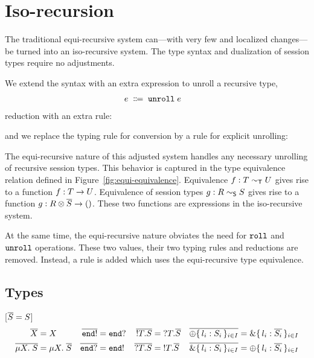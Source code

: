 \section{Iso-recursion}
\label{sec:iso-recursion}

The traditional equi-recursive system can---with very few and localized changes---be turned
into an iso-recursive system. The type syntax and dualization of
session types require no adjustments.

We extend the syntax with an extra expression to unroll a recursive
type,
\begin{align*}
    e \grmdef&
               \EUnroll e
\end{align*}
%
reduction with an extra rule:
%
\begin{mathpar}
\end{mathpar}
%
and we replace the typing rule for conversion by a rule for explicit unrolling:
\begin{mathpar}
\end{mathpar}

The equi-recursive nature of this adjusted system handles any necessary
unrolling of recursive session types. This behavior is captured in the type
equivalence relation defined in Figure~\ref{fig:equi-equivalence}. Equivalence
$f : T \eqt U$ gives rise to a function $f : \TFun {T} {U}$.
Equivalence of session types $g : R \eqs S$ gives rise
to a function $g : \TFun {\TPair {R} {\TDual{S}}} \TUnit$.
These two functions are expressions in the iso-recursive system.

At the same time, the equi-recursive nature obviates the need for $\EkwRoll$
and $\EkwUnroll$ operations. These two values, their two typing rules and
reductions are removed. Instead, a rule is added which uses the equi-recursive
type equivalence.

\subsection{Types}


[$\TDual S = S$]
\begin{align*}
  \TDual X &= X                               &
  \TDual{\TEnd !} &= \TEnd ?                  &
  \TDual{\TOut T S} &= \TIn T \TDual{S}       &
  \TDual{\TSelect{ l_i: S_i }} &=
    \TCase{ l_i: \TDual{S_i} }                \\
  \TDual{\TRec S} &= \TRec{\TDual S}          &
  \TDual{\TEnd ?} &= \TEnd !                  &
  \TDual{\TIn T S} &= \TOut T \TDual{S}       &
  \TDual{\TCase{ l_i: S_i }} &=
    \TSelect{ l_i: \TDual{S_i} }
\end{align*}

